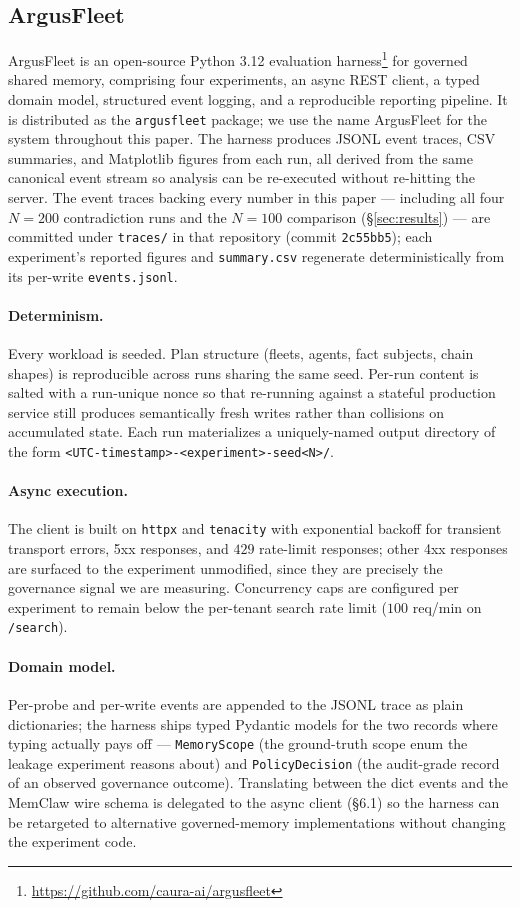 \documentclass[10pt,twocolumn,letterpaper]{article}
\begin{document}
\subsection{ArgusFleet}

ArgusFleet is an open-source Python 3.12 evaluation harness\footnote{\url{https://github.com/caura-ai/argusfleet}} for governed shared memory, comprising four experiments, an async REST client, a typed domain model, structured event logging, and a reproducible reporting pipeline. It is distributed as the \texttt{argusfleet} package; we use the name ArgusFleet for the system throughout this paper. The harness produces JSONL event traces, CSV summaries, and Matplotlib figures from each run, all derived from the same canonical event stream so analysis can be re-executed without re-hitting the server. The event traces backing every number in this paper --- including all four \(N{=}200\) contradiction runs and the \(N{=}100\) comparison (\S\ref{sec:results}) --- are committed under \texttt{traces/} in that repository (commit \texttt{2c55bb5}); each experiment's reported figures and \texttt{summary.csv} regenerate deterministically from its per-write \texttt{events.jsonl}.

\paragraph{Determinism.}
Every workload is seeded. Plan structure (fleets, agents, fact subjects, chain shapes) is reproducible across runs sharing the same seed. Per-run content is salted with a run-unique nonce so that re-running against a stateful production service still produces semantically fresh writes rather than collisions on accumulated state. Each run materializes a uniquely-named output directory of the form \texttt{<UTC-timestamp>-<experiment>-seed<N>/}.

\paragraph{Async execution.}
The client is built on \texttt{httpx} and \texttt{tenacity} with exponential backoff for transient transport errors, 5xx responses, and \(429\) rate-limit responses; other 4xx responses are surfaced to the experiment unmodified, since they are precisely the governance signal we are measuring. Concurrency caps are configured per experiment to remain below the per-tenant search rate limit (\(100\) req/min on \texttt{/search}).

\paragraph{Domain model.}
Per-probe and per-write events are appended to the JSONL trace as
plain dictionaries; the harness ships typed Pydantic models for the two
records where typing actually pays off --- \texttt{MemoryScope} (the
ground-truth scope enum the leakage experiment reasons about) and
\texttt{PolicyDecision} (the audit-grade record of an observed
governance outcome). Translating between the dict events and the
MemClaw wire schema is delegated to the async client (\S6.1) so the
harness can be retargeted to alternative governed-memory implementations
without changing the experiment code.
\end{document}
